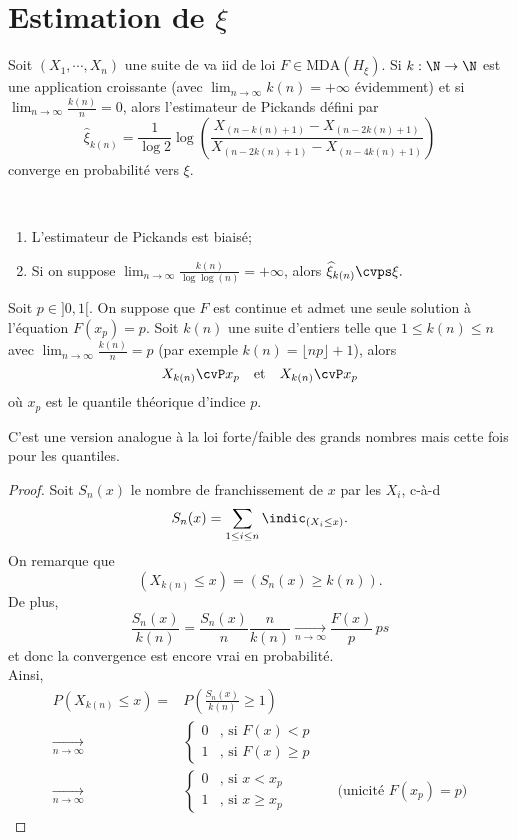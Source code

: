 \documentclass[10p,a4paper,reqno,titlepage]{report}
\begin{document}
\section{Estimation de $\xi$}
\begin{thm}
	Soit $(X_1,\cdots,X_n)$ une suite de va iid de loi $F \in \mathrm{MDA}(H_\xi)$. Si $k:\N\to \N$ est une application croissante (avec $\lim_{n\to\infty} k(n)=+\infty$ évidemment) et si $\lim_{n\to\infty} \tfrac{k(n)}{n}=0$, alors l'estimateur de Pickands défini par 
	$$ \widehat{\xi}_{k(n)} = \frac{1}{\log 2} \log\left(\frac{X_{(n-k(n)+1)} -X_{(n-2k(n)+1)}}{X_{(n-2k(n)+1)}- X_{(n -4k(n)+1)}}\right)$$
	converge en probabilité vers $\xi$.
\end{thm}
\begin{rem}\
\begin{enumerate}
	\item L'estimateur de Pickands est biaisé;
	\item Si on suppose $\lim_{n\to \infty} \tfrac{k(n)}{\log \log (n)}=+\infty$, alors $\widehat{\xi}_{k(n)}\cvps \xi.$
\end{enumerate}
\end{rem}
\begin{prop}
	Soit $p \in ]0,1[$. On suppose que $F$ est continue et admet une seule solution à l'équation $F(x_p)=p$. Soit $k(n)$ une suite d'entiers telle que $1 \leq k(n) \leq n$ avec $\lim_{n\to\infty}\tfrac{k(n)}{n}=p$ (par exemple $k(n)= \lfloor np \rfloor +1$), alors 
	$$ X_{k(n)} \cvP x_p\quad \text{et}\quad X_{k(n)}\cvP x_p$$
	où $x_p$ est le quantile théorique d'indice $p$.
\end{prop}
\begin{rem}
	C'est une version analogue à la loi forte/faible des grands nombres mais cette fois pour les quantiles.
\end{rem}
\begin{proof}
	Soit $S_n (x)$ le nombre de franchissement de $x$ par les $X_i$, c-à-d
	$$S_n (x)= \sum_{1\leq i \leq n} \indic_{(X_i \leq x)}.$$
	On remarque que 
	$$ (X_{k(n)}\leq x )= (S_n (x) \geq k (n)).$$
	De plus,
	$$ \frac{S_n (x)}{k(n)}= \frac{S_n(x)}{n}\frac{n}{k(n)}\underset{n\to\infty}{\longrightarrow} \frac{F(x)}{p} \,ps$$
	et donc la convergence est encore vrai en probabilité.\\
	Ainsi,
	\begin{align*}
		P(X_{k(n)} \leq x) = & P\left(\frac{S_n(x)}{k(n)}\geq 1\right)\\
		 \underset{n\to\infty}{\longrightarrow} & \left\{\begin{array}{ll}
		 	0 & \text{, si }F(x)< p \\ 1 & \text{, si }F(x)\geq p
		 \end{array}\right.\\
	 \underset{n\to\infty}{\longrightarrow} & \left\{\begin{array}{ll}
	 	0 & \text{, si }x< x_p \\ 1 & \text{, si }x\geq x_p
	 \end{array}\right. && \text{(unicité $F(x_p)=p$)}
	\end{align*}
\end{proof}
\end{document}
